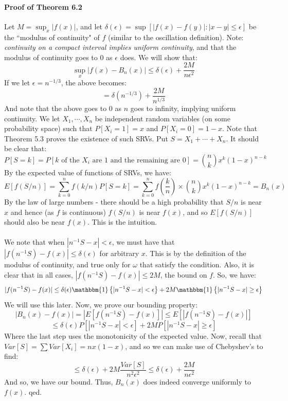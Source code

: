 \documentclass[12pt,a4paper]{article}
\newcommand{\1}[1]{\mathbbm{1}\left\{ #1 \right\}}
\begin{document}
\paragraph{Proof of Theorem 6.2} Let $M = \sup_x |f(x)|$, and let $\delta(\epsilon) = \sup\left[|f(x)-f(y)| : |x - y| \leq \epsilon\right]$ be the ``modulus of continuity" of $f$ (similar to the oscillation definition). Note: \textit{continuity on a compact interval implies uniform continuity}, and that the modulus of continuity goes to $0$ as $\epsilon$ does. We will show that:
$$
	\sup_x |f(x) - B_n(x)| \leq \delta(\epsilon) + \frac{2M}{n\epsilon^2}
$$
If we let $\epsilon = n^{-1/3}$, the above becomes:
$$
	= \delta(n^{-1/3}) + \frac{2M}{n^{1/3}}
$$
And note that the above goes to $0$ as $n$ goes to infinity, implying uniform continuity. We let $X_1, \cdots, X_n$ be independent random variables (on some probability space) such that $P[X_i = 1] = x$ and $P[X_i = 0] = 1-x$. Note that Theorem 5.3 proves the existence of such SRVs. Put $S = X_1 + \cdots + X_n$. It should be clear that:
$$
	P[S = k] = P\left[\text{$k$ of the $X_i$ are $1$ and the remaining are $0$}\right] =
	{n \choose k} x^k (1-x)^{n-k}
$$
By the expected value of functions of SRVs, we have:
$$
	E[f(S/n)] = \sum_{k=0}^n f(k/n) P[S = k] = \sum_{k=0}^n f\left(\frac{k}{n}\right) \times {n \choose k} x^k(1-x)^{n-k} =
	B_n(x)
$$
By the law of large numbers - there should be a high probability that $S/n$ is near $x$ and hence (as $f$ is continuous) $f(S/n)$ is near $f(x)$, and so $E[f(S/n)]$ should also be near $f(x)$. This is the intuition.
\\\\
We note that when $|n^{-1}S - x| < \epsilon$, we must have that $|f(n^{-1}S) - f(x)| \leq \delta(\epsilon)$ for arbitrary $x$. This is by the definition of the modulus of continuity, and true only for $\omega$ that satisfy the condition. Also, it is clear that in all cases, $|f(n^{-1}S) - f(x)| \leq 2M$, the bound on $f$. So, we have:
$$
	|f(n^{-1}S) - f(x)| \leq
	\delta(\epsilon)\1{|n^{-1}S - x| < \epsilon} + 2M\1{|n^{-1}S - x| \geq \epsilon}
$$
We will use this later. Now, we prove our bounding property:
$$
	|B_n(x) - f(x)| = \left|E[f(n^{-1}S) - f(x)]\right| \leq
	E\left[\left|f(n^{-1}S) - f(x)\right|\right]
$$
$$
	\leq \delta(\epsilon)P\left[|n^{-1}S - x| < \epsilon\right] + 2MP\left[|n^{-1}S - x| \geq \epsilon\right]
$$
Where the last step uses the monotonicity of the expected value. Now, recall that $Var[S] = \sum Var[X_i] = nx(1-x)$, and so we can make use of Chebyshev's to find:
$$
	\leq \delta(\epsilon) + 2M \frac{Var[S]}{n^2\epsilon^2} \leq \delta(\epsilon) + \frac{2M}{n\epsilon^2}
$$
And so, we have our bound. Thus, $B_n(x)$ does indeed converge uniformly to $f(x)$. qed.
\end{document}
